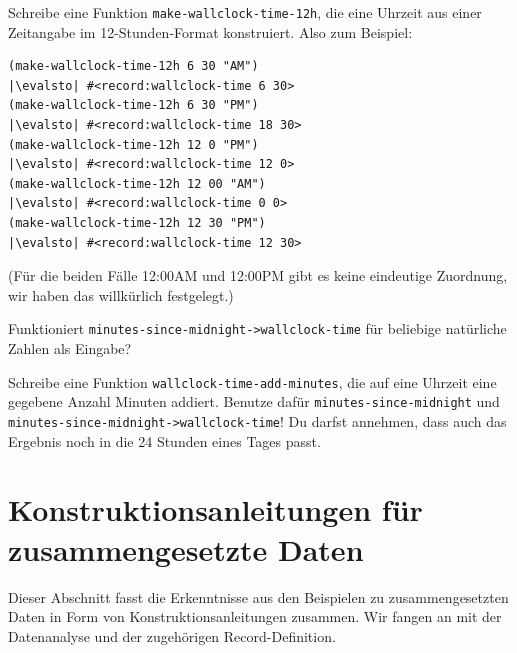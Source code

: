 \begin{aufgabeinline}
  Schreibe eine Funktion \lstinline{make-wallclock-time-12h}, die eine
  Uhrzeit aus einer Zeitangabe im 12-Stunden-Format konstruiert.  Also
  zum Beispiel:
\begin{lstlisting}
(make-wallclock-time-12h 6 30 "AM")
|\evalsto| #<record:wallclock-time 6 30>
(make-wallclock-time-12h 6 30 "PM")
|\evalsto| #<record:wallclock-time 18 30>
(make-wallclock-time-12h 12 0 "PM")
|\evalsto| #<record:wallclock-time 12 0>
(make-wallclock-time-12h 12 00 "AM")
|\evalsto| #<record:wallclock-time 0 0>
(make-wallclock-time-12h 12 30 "PM")
|\evalsto| #<record:wallclock-time 12 30>
\end{lstlisting}
  (Für die beiden Fälle 12:00AM und 12:00PM gibt es keine eindeutige
  Zuordnung, wir haben das willkürlich festgelegt.)
\end{aufgabeinline}

\begin{aufgabeinline}
  Funktioniert \lstinline{minutes-since-midnight->wallclock-time} für
  beliebige natürliche Zahlen als Eingabe?
\end{aufgabeinline}

\begin{aufgabeinline}
  Schreibe eine Funktion \lstinline{wallclock-time-add-minutes}, die
  auf eine Uhrzeit eine gegebene Anzahl Minuten addiert.  Benutze
  dafür \lstinline{minutes-since-midnight} und
  \lstinline{minutes-since-midnight->wallclock-time}!  Du darfst
  annehmen, dass auch das Ergebnis noch in die 24 Stunden eines Tages
  passt.
\end{aufgabeinline}

\section{Konstruktionsanleitungen für zusammengesetzte Daten}

Dieser Abschnitt fasst die Erkenntnisse aus den Beispielen
zu zusammengesetzten Daten in Form von Konstruktionsanleitungen
zusammen.  Wir fangen an mit der Datenanalyse und der zugehörigen
Record-Definition.

